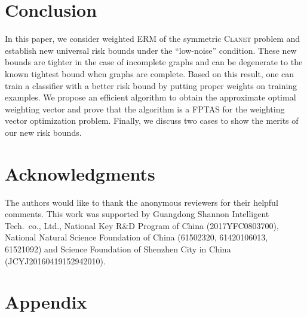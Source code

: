 \documentclass[letterpaper]{article} %
\newcommand{\problemabbr}{\textnormal{C}\textsc{lanet}}
\begin{document}

\section{Conclusion} %
\label{sec:conclusion}
In this paper, we consider weighted ERM of the symmetric \problemabbr{} problem and establish new universal risk bounds under the ``low-noise'' condition. 
These new bounds are tighter in the case of incomplete graphs and can be degenerate to the known tightest bound when graphs are complete. 
Based on this result, one can train a classifier with a better risk bound by putting proper weights on training examples. 
We propose an efficient algorithm to obtain the approximate optimal weighting vector and prove that the algorithm is a FPTAS for the weighting vector optimization problem. 
Finally, we discuss two cases to show the merits of our new risk bounds.


\section*{Acknowledgments}

The authors would like to thank the anonymous reviewers for their helpful comments. This work was supported by Guangdong Shannon Intelligent Tech.\ co., Ltd., National Key R$\&$D Program of China (2017YFC0803700), National Natural Science Foundation of China (61502320, 61420106013, 61521092) and Science Foundation of Shenzhen City in China (JCYJ20160419152942010).





\section*{Appendix} %
\appendix
\label{sec:appendix}
\end{document}

